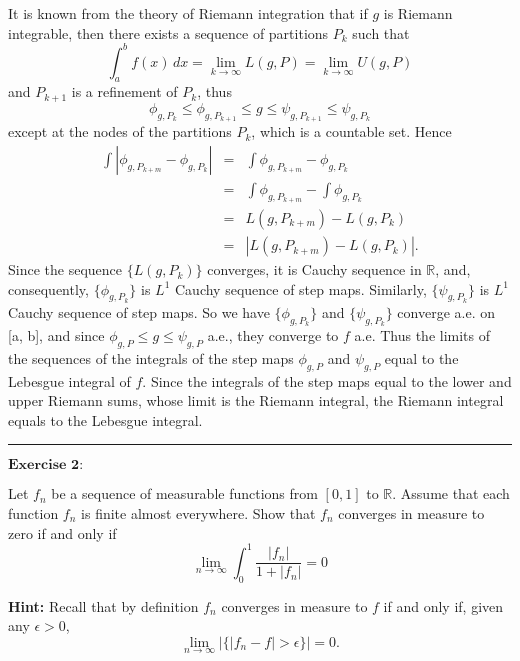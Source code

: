 \documentclass[12pt]{article}
\begin{document}
It is known from the theory of Riemann integration that if $g$ is Riemann integrable, then there exists a sequence of partitions $P_{k}$ such that
\begin{equation*}
    \int_{a}^{b} f(x) \, d x = \lim_{k \to \infty} L(g, P) = \lim_{k \to \infty} U(g, P)
\end{equation*}
and $P_{k+1}$ is a refinement of $P_{k}$, thus
\begin{equation*}
    \phi_{g, P_{k}} \leq \phi_{g, P_{k+1}}  \leq g \leq \psi_{g, P_{k+1}} \leq \psi_{g, P_{k}} 
\end{equation*}
except at the nodes of the partitions $P_{k}$, which is a countable set. Hence
\begin{eqnarray*}
    \int |\phi_{g, P_{k+m}} - \phi_{g, P_{k}} | & = & \int \phi_{g, P_{k+m}} - \phi_{g, P_{k}}   \\
    & = & \int \phi_{g, P_{k+m}} - \int \phi_{g, P_{k}}  \\
    & = & L(g, P_{k+m}) - L(g, P_{k}) \\
    & = & |L(g, P_{k+m}) - L(g, P_{k})|.
\end{eqnarray*}
Since the sequence $\{ L (g, P_{k}) \}$ converges, it is Cauchy sequence in $\mathbb{R}$, and, consequently, $\{\phi_{g, P_{k}} \}$ is $L^{1}$ Cauchy sequence of step maps. Similarly,  $\{\psi_{g, P_{k}} \}$ is $L^{1}$ Cauchy sequence of step maps. So we have $\{\phi_{g, P_{k}} \}$ and $\{\psi_{g, P_{k}} \}$ converge a.e. on [a, b], and since $\phi_{g, P} \leq g \leq \psi_{g, P}$ a.e., they converge to $f$ a.e. Thus the limits of the sequences of the integrals of the step maps $\phi_{g, P}$ and $\psi_{g, P}$ equal to the Lebesgue integral of $f$. Since the integrals of the step maps equal to the lower and upper Riemann sums, whose limit is the Riemann integral, the Riemann integral equals to the Lebesgue integral.


\noindent\rule[0.25\baselineskip]{\textwidth}{0.5pt}

\vspace{8pt}
$\textbf{Exercise 2:}$

Let $f_{n}$ be a sequence of measurable functions from $[0, 1]$ to $\mathbb{R}$. Assume that each function $f_{n}$ is finite almost everywhere. Show that $f_{n}$ converges in measure to zero if and only if 
\begin{equation*}
    \lim_{n \to \infty} \int_{0}^{1} \frac{|f_{n}|}{1 + |f_{n}|} = 0
\end{equation*}

\textbf{Hint:} Recall that by definition $f_{n}$ converges in measure to $f$ if and only if, given any $\epsilon > 0$,
\begin{equation*}
    \lim_{n \to \infty} |\{ |f_{n} - f| > \epsilon \}| = 0.
\end{equation*}
\end{document}
